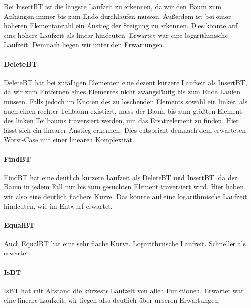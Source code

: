 \documentclass[11pt]{article}
\begin{document}
        Bei InsertBT ist die längste Laufzeit zu erkennen, da wir den Baum zum Anhängen immer bis zum Ende durchlaufen müssen. Außerdem ist bei einer höheren Elementanzahl ein Anstieg der Steigung zu erkennen.
        Dies könnte auf eine höhere Laufzeit als linear hindeuten.
        Erwartet war eine logarithmische Laufzeit. Demnach liegen wir unter den Erwartungen. 

        \paragraph{DeleteBT}  
        
        DeleteBT hat bei zufälligen Elementen eine dezent kürzere Laufzeit als InsertBT, da wir zum Entfernen eines Elementes nicht zwangsläufig bis zum Ende Laufen müssen.
        Falls jedoch im Knoten des zu löschenden Elements sowohl ein linker, als auch einen rechter Teilbaum existiert, muss der Baum bis zum größten Element des linken Teilbaums traversiert werden, um das Ersatzelement zu finden. Hier lässt sich ein linearer Anstieg erkennen. 
        Dies entspricht demnach dem erwarteten Worst-Case mit einer linearen Komplexität.

        \paragraph{FindBT}
        
        FindBT hat eine deutlich kürzere Laufzeit als DeleteBT und InsertBT, da der Baum in jedem Fall nur bis zum gesuchten Element traversiert wird. 
        Hier haben wir also eine deutlich flachere Kurve. Das könnte auf eine logarithmische Laufzeit hindeuten, wie im Entwurf erwartet. 

        \paragraph{EqualBT}
        
        Auch EqualBT hat eine sehr flache Kurve. Logarithmische Laufzeit. Schneller als erwartet.

        \paragraph{IsBT}
        
        IsBT hat mit Abstand die kürzeste Laufzeit von allen Funktionen. Erwartet war eine lineare Laufzeit, wir liegen also deutlich über unseren Erwartungen.
\end{document}
